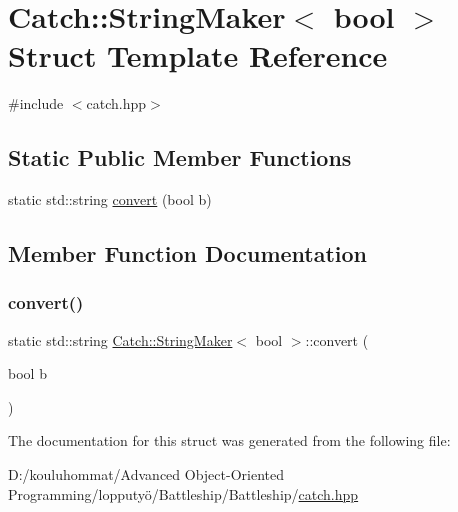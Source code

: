 \hypertarget{struct_catch_1_1_string_maker_3_01bool_01_4}{}\section{Catch\+:\+:String\+Maker$<$ bool $>$ Struct Template Reference}
\label{struct_catch_1_1_string_maker_3_01bool_01_4}


{\ttfamily \#include $<$catch.\+hpp$>$}

\subsection*{Static Public Member Functions}
\begin{DoxyCompactItemize}
\item 
static std\+::string \mbox{\hyperlink{struct_catch_1_1_string_maker_3_01bool_01_4_a37e9899c82c4b4515f876f16f8957a77}{convert}} (bool b)
\end{DoxyCompactItemize}


\subsection{Member Function Documentation}
\mbox{\label{struct_catch_1_1_string_maker_3_01bool_01_4_a37e9899c82c4b4515f876f16f8957a77}} 
\subsubsection{\texorpdfstring{convert()}{convert()}}
{\footnotesize\ttfamily static std\+::string \mbox{\hyperlink{struct_catch_1_1_string_maker}{Catch\+::\+String\+Maker}}$<$ bool $>$\+::convert (\begin{DoxyParamCaption}\item[{bool}]{b }\end{DoxyParamCaption})\hspace{0.3cm}{\ttfamily [static]}}



The documentation for this struct was generated from the following file\+:\begin{DoxyCompactItemize}
\item 
D\+:/kouluhommat/\+Advanced Object-\/\+Oriented Programming/lopputyö/\+Battleship/\+Battleship/\mbox{\hyperlink{catch_8hpp}{catch.\+hpp}}\end{DoxyCompactItemize}
